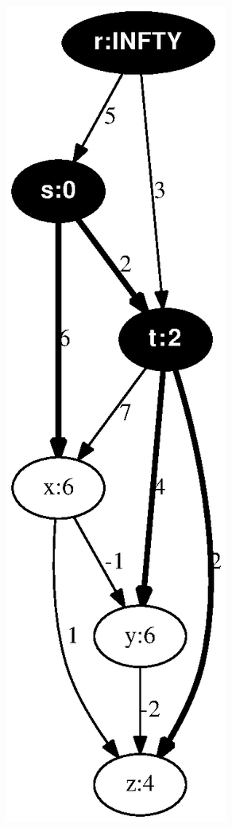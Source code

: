 \documentclass{article}
\begin{document}
\includegraphics[height=.3\textheight]{dag_shortest_path_03.eps}
\vspace{1em}
\end{document}
